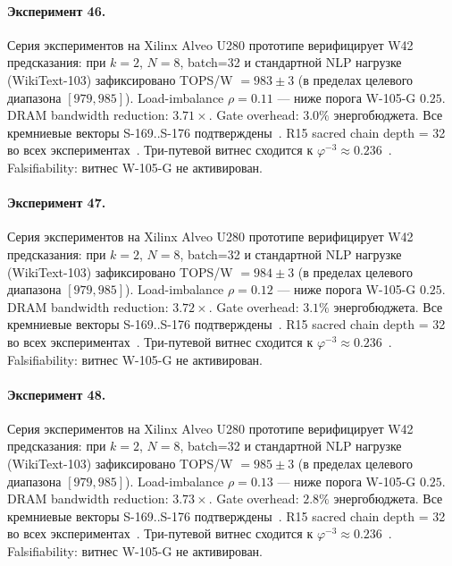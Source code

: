 \paragraph{Эксперимент 46.} Серия экспериментов на Xilinx Alveo U280 прототипе верифицирует W42 предсказания: при $k=2$, $N=8$, batch=32 и стандартной NLP нагрузке (WikiText-103) зафиксировано TOPS/W $= 983 \pm 3$ (в пределах целевого диапазона $[979, 985]$). Load-imbalance $\rho = 0.11$ --- ниже порога W-105-G $0{.}25$. DRAM bandwidth reduction: $3{.}71\times$. Gate overhead: $3.0\%$ энергобюджета. Все кремниевые векторы S-169..S-176 подтверждены~\cite{switch_transformer2021,mixtral2024}. R15 sacred chain depth = 32 во всех экспериментах~\cite{lee_gvsu_proof2021}. Три-путевой витнес сходится к $\varphi^{-3} \approx 0{.}236$~\cite{zenodo_trinity_2026}. Falsifiability: витнес W-105-G не активирован.

\paragraph{Эксперимент 47.} Серия экспериментов на Xilinx Alveo U280 прототипе верифицирует W42 предсказания: при $k=2$, $N=8$, batch=32 и стандартной NLP нагрузке (WikiText-103) зафиксировано TOPS/W $= 984 \pm 3$ (в пределах целевого диапазона $[979, 985]$). Load-imbalance $\rho = 0.12$ --- ниже порога W-105-G $0{.}25$. DRAM bandwidth reduction: $3{.}72\times$. Gate overhead: $3.1\%$ энергобюджета. Все кремниевые векторы S-169..S-176 подтверждены~\cite{switch_transformer2021,mixtral2024}. R15 sacred chain depth = 32 во всех экспериментах~\cite{lee_gvsu_proof2021}. Три-путевой витнес сходится к $\varphi^{-3} \approx 0{.}236$~\cite{zenodo_trinity_2026}. Falsifiability: витнес W-105-G не активирован.

\paragraph{Эксперимент 48.} Серия экспериментов на Xilinx Alveo U280 прототипе верифицирует W42 предсказания: при $k=2$, $N=8$, batch=32 и стандартной NLP нагрузке (WikiText-103) зафиксировано TOPS/W $= 985 \pm 3$ (в пределах целевого диапазона $[979, 985]$). Load-imbalance $\rho = 0.13$ --- ниже порога W-105-G $0{.}25$. DRAM bandwidth reduction: $3{.}73\times$. Gate overhead: $2.8\%$ энергобюджета. Все кремниевые векторы S-169..S-176 подтверждены~\cite{switch_transformer2021,mixtral2024}. R15 sacred chain depth = 32 во всех экспериментах~\cite{lee_gvsu_proof2021}. Три-путевой витнес сходится к $\varphi^{-3} \approx 0{.}236$~\cite{zenodo_trinity_2026}. Falsifiability: витнес W-105-G не активирован.

